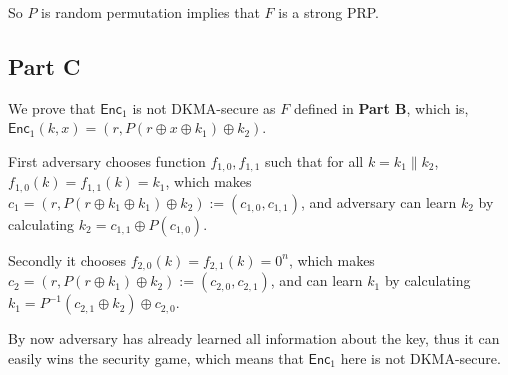 \documentclass[8pt]{article}
\theoremstyle{compact}
\begin{document}
So $P$ is random permutation implies that $F$ is a strong PRP.

\subsection*{Part C}

We prove that $\textsf{Enc}_1$ is not DKMA-secure as $F$ defined in \textbf{Part B}, which is, $\textsf{Enc}_1(k, x) = (r, P(r \oplus x \oplus k_1) \oplus k_2)$.

First adversary chooses function $f_{1, 0}, f_{1, 1}$ such that for all $k = k_1 \| k_2$, $f_{1, 0}(k) = f_{1, 1}(k) = k_1$, which makes $c_1 = (r, P(r \oplus k_1 \oplus k_1) \oplus k_2) := (c_{1, 0}, c_{1, 1})$, and adversary can learn $k_2$ by calculating $k_2 = c_{1, 1} \oplus P(c_{1, 0})$.

Secondly it chooses $f_{2, 0}(k) = f_{2, 1}(k) = 0^n$, which makes $c_2 = (r, P(r \oplus k_1) \oplus k_2) := (c_{2, 0}, c_{2, 1})$, and can learn $k_1$ by calculating $k_1 = P^{-1}(c_{2, 1} \oplus k_2) \oplus c_{2, 0}$.

By now adversary has already learned all information about the key, thus it can easily wins the security game, which means that $\textsf{Enc}_1$ here is not DKMA-secure.
\end{document}

